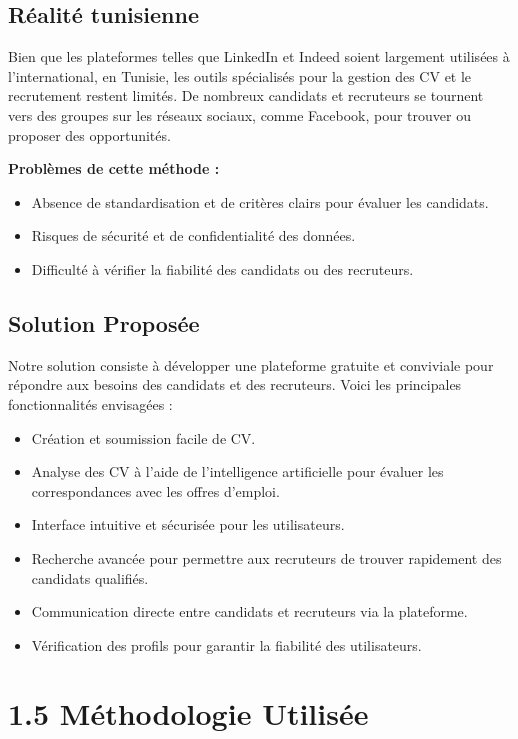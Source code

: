 \documentclass[12pt, letterpaper]{article}
\begin{document}
\subsection{Réalité tunisienne}
Bien que les plateformes telles que LinkedIn et Indeed soient largement utilisées à l'international, en Tunisie, les outils spécialisés pour la gestion des CV et le recrutement restent limités. De nombreux candidats et recruteurs se tournent vers des groupes sur les réseaux sociaux, comme Facebook, pour trouver ou proposer des opportunités. 

\textbf{Problèmes de cette méthode :}
\begin{itemize}
    \item Absence de standardisation et de critères clairs pour évaluer les candidats.
    \item Risques de sécurité et de confidentialité des données.
    \item Difficulté à vérifier la fiabilité des candidats ou des recruteurs.
\end{itemize}

\subsection{Solution Proposée}
Notre solution consiste à développer une plateforme gratuite et conviviale pour répondre aux besoins des candidats et des recruteurs. Voici les principales fonctionnalités envisagées :
\begin{itemize}
    \item Création et soumission facile de CV.
    \item Analyse des CV à l'aide de l'intelligence artificielle pour évaluer les correspondances avec les offres d'emploi.
    \item Interface intuitive et sécurisée pour les utilisateurs.
    \item Recherche avancée pour permettre aux recruteurs de trouver rapidement des candidats qualifiés.
    \item Communication directe entre candidats et recruteurs via la plateforme.
    \item Vérification des profils pour garantir la fiabilité des utilisateurs.
\end{itemize}

\section{1.5 Méthodologie Utilisée}
\end{document}

